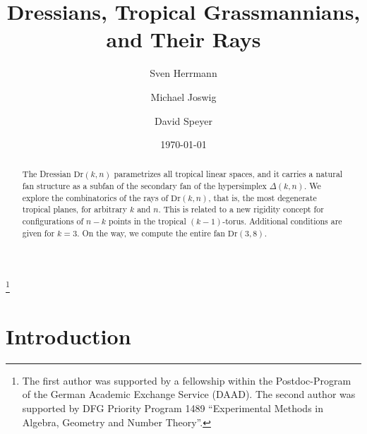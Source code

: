 \documentclass[11pt,a4paper]{amsart}
\newcommand{\Dr}[2]{{\mathrm{Dr}(#1,#2)}}
\theoremstyle{plain}
\theoremstyle{definition}
\begin{document}
\title[Dressians and Their Rays]{Dressians, Tropical Grassmannians,\\ and Their Rays}

\author[Herrmann, Joswig and Speyer]{Sven Herrmann \and Michael Joswig \and David Speyer}
\address{Sven Herrmann, School of Computing Sciences, University of East Anglia, Norwich, NR4~7TJ, UK}
\address{Michael Joswig, Fachbereich Mathematik, TU Darmstadt, 64289 Darmstadt, Germany}
\address{David Speyer, Department of Mathematics, 530 Church Street, Ann Arbor, MI 48109-1043 USA}
\thanks{The first author was supported by a fellowship within the Postdoc-Program of the German
  Academic Exchange Service (DAAD).  The second author was supported by DFG Priority Program 1489
  ``Experimental Methods in Algebra, Geometry and Number Theory''.}

\date{\today}
\begin{abstract}
  The Dressian $\Dr kn$ parametrizes all tropical linear spaces, and it carries a natural fan
  structure as a subfan of the secondary fan of the hypersimplex $\Delta(k,n)$.  We explore the
  combinatorics of the rays of $\Dr kn$, that is, the most degenerate tropical planes, for arbitrary
  $k$ and $n$.  This is related to a new rigidity concept for configurations of $n-k$ points in the
  tropical $(k{-}1)$-torus.  Additional conditions are given for $k=3$.  On the way, we compute the
  entire fan $\Dr38$.
\end{abstract}

\maketitle

\section{Introduction}
\end{document}
